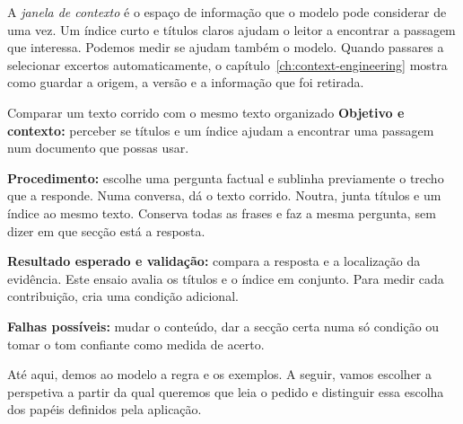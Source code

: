 A \emph{janela de contexto} é o espaço de informação que o modelo pode considerar de uma vez. Um índice curto e títulos claros ajudam o leitor a encontrar a passagem que interessa. Podemos medir se ajudam também o modelo. Quando passares a selecionar excertos automaticamente, o capítulo~\ref{ch:context-engineering} mostra como guardar a origem, a versão e a informação que foi retirada.

\begin{promptlabbox}{Comparar um texto corrido com o mesmo texto organizado}
\textbf{Objetivo e contexto:} perceber se títulos e um índice ajudam a encontrar uma passagem num documento que possas usar.

\textbf{Procedimento:} escolhe uma pergunta factual e sublinha previamente o trecho que a responde. Numa conversa, dá o texto corrido. Noutra, junta títulos e um índice ao mesmo texto. Conserva todas as frases e faz a mesma pergunta, sem dizer em que secção está a resposta.

\textbf{Resultado esperado e validação:} compara a resposta e a localização da evidência. Este ensaio avalia os títulos e o índice em conjunto. Para medir cada contribuição, cria uma condição adicional.

\textbf{Falhas possíveis:} mudar o conteúdo, dar a secção certa numa só condição ou tomar o tom confiante como medida de acerto.
\end{promptlabbox}

Até aqui, demos ao modelo a regra e os exemplos. A seguir, vamos escolher a perspetiva a partir da qual queremos que leia o pedido e distinguir essa escolha dos papéis definidos pela aplicação.
